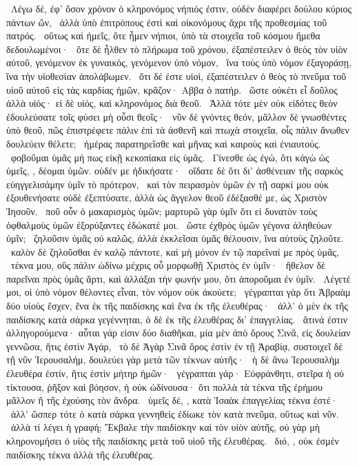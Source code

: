 ~Λέγω δέ, ἐφ’ ὅσον χρόνον ὁ κληρονόμος νήπιός ἐστιν, οὐδὲν διαφέρει δούλου κύριος πάντων ὤν,
~ἀλλὰ ὑπὸ ἐπιτρόπους ἐστὶ καὶ οἰκονόμους ἄχρι τῆς προθεσμίας τοῦ πατρός.
~οὕτως καὶ ἡμεῖς, ὅτε ἦμεν νήπιοι, ὑπὸ τὰ στοιχεῖα τοῦ κόσμου ἤμεθα δεδουλωμένοι·
~ὅτε δὲ ἦλθεν τὸ πλήρωμα τοῦ χρόνου, ἐξαπέστειλεν ὁ θεὸς τὸν υἱὸν αὐτοῦ, γενόμενον ἐκ γυναικός, γενόμενον ὑπὸ νόμον,
~ἵνα τοὺς ὑπὸ νόμον ἐξαγοράσῃ, ἵνα τὴν υἱοθεσίαν ἀπολάβωμεν.
~ὅτι δέ ἐστε υἱοί, ἐξαπέστειλεν ὁ θεὸς τὸ πνεῦμα τοῦ υἱοῦ αὐτοῦ εἰς τὰς καρδίας ἡμῶν, κρᾶζον· Αββα ὁ πατήρ.
~ὥστε οὐκέτι εἶ δοῦλος ἀλλὰ υἱός· εἰ δὲ υἱός, καὶ κληρονόμος διὰ θεοῦ.
~Ἀλλὰ τότε μὲν οὐκ εἰδότες θεὸν ἐδουλεύσατε τοῖς φύσει μὴ οὖσι θεοῖς·
~νῦν δὲ γνόντες θεόν, μᾶλλον δὲ γνωσθέντες ὑπὸ θεοῦ, πῶς ἐπιστρέφετε πάλιν ἐπὶ τὰ ἀσθενῆ καὶ πτωχὰ στοιχεῖα, οἷς πάλιν ἄνωθεν δουλεύειν θέλετε;
~ἡμέρας παρατηρεῖσθε καὶ μῆνας καὶ καιροὺς καὶ ἐνιαυτούς.
~φοβοῦμαι ὑμᾶς μή πως εἰκῇ κεκοπίακα εἰς ὑμᾶς.
~Γίνεσθε ὡς ἐγώ, ὅτι κἀγὼ ὡς ὑμεῖς, , δέομαι ὑμῶν. οὐδέν με ἠδικήσατε·
~οἴδατε δὲ ὅτι δι’ ἀσθένειαν τῆς σαρκὸς εὐηγγελισάμην ὑμῖν τὸ πρότερον,
~καὶ τὸν πειρασμὸν ὑμῶν ἐν τῇ σαρκί μου οὐκ ἐξουθενήσατε οὐδὲ ἐξεπτύσατε, ἀλλὰ ὡς ἄγγελον θεοῦ ἐδέξασθέ με, ὡς Χριστὸν Ἰησοῦν.
~ποῦ οὖν ὁ μακαρισμὸς ὑμῶν; μαρτυρῶ γὰρ ὑμῖν ὅτι εἰ δυνατὸν τοὺς ὀφθαλμοὺς ὑμῶν ἐξορύξαντες ἐδώκατέ μοι.
~ὥστε ἐχθρὸς ὑμῶν γέγονα ἀληθεύων ὑμῖν;
~ζηλοῦσιν ὑμᾶς οὐ καλῶς, ἀλλὰ ἐκκλεῖσαι ὑμᾶς θέλουσιν, ἵνα αὐτοὺς ζηλοῦτε.
~καλὸν δὲ ζηλοῦσθαι ἐν καλῷ πάντοτε, καὶ μὴ μόνον ἐν τῷ παρεῖναί με πρὸς ὑμᾶς,
~τέκνα μου, οὓς πάλιν ὠδίνω μέχρις οὗ μορφωθῇ Χριστὸς ἐν ὑμῖν·
~ἤθελον δὲ παρεῖναι πρὸς ὑμᾶς ἄρτι, καὶ ἀλλάξαι τὴν φωνήν μου, ὅτι ἀποροῦμαι ἐν ὑμῖν.
~Λέγετέ μοι, οἱ ὑπὸ νόμον θέλοντες εἶναι, τὸν νόμον οὐκ ἀκούετε;
~γέγραπται γὰρ ὅτι Ἀβραὰμ δύο υἱοὺς ἔσχεν, ἕνα ἐκ τῆς παιδίσκης καὶ ἕνα ἐκ τῆς ἐλευθέρας·
~ἀλλ’ ὁ μὲν ἐκ τῆς παιδίσκης κατὰ σάρκα γεγέννηται, ὁ δὲ ἐκ τῆς ἐλευθέρας δι’ ἐπαγγελίας.
~ἅτινά ἐστιν ἀλληγορούμενα· αὗται γάρ εἰσιν δύο διαθῆκαι, μία μὲν ἀπὸ ὄρους Σινᾶ, εἰς δουλείαν γεννῶσα, ἥτις ἐστὶν Ἁγάρ,
~τὸ δὲ Ἁγὰρ Σινᾶ ὄρος ἐστὶν ἐν τῇ Ἀραβίᾳ, συστοιχεῖ δὲ τῇ νῦν Ἰερουσαλήμ, δουλεύει γὰρ μετὰ τῶν τέκνων αὐτῆς·
~ἡ δὲ ἄνω Ἰερουσαλὴμ ἐλευθέρα ἐστίν, ἥτις ἐστὶν μήτηρ ἡμῶν·
~γέγραπται γάρ· Εὐφράνθητι, στεῖρα ἡ οὐ τίκτουσα, ῥῆξον καὶ βόησον, ἡ οὐκ ὠδίνουσα· ὅτι πολλὰ τὰ τέκνα τῆς ἐρήμου μᾶλλον ἢ τῆς ἐχούσης τὸν ἄνδρα.
~ὑμεῖς δέ, , κατὰ Ἰσαὰκ ἐπαγγελίας τέκνα ἐστέ·
~ἀλλ’ ὥσπερ τότε ὁ κατὰ σάρκα γεννηθεὶς ἐδίωκε τὸν κατὰ πνεῦμα, οὕτως καὶ νῦν.
~ἀλλὰ τί λέγει ἡ γραφή; Ἔκβαλε τὴν παιδίσκην καὶ τὸν υἱὸν αὐτῆς, οὐ γὰρ μὴ κληρονομήσει ὁ υἱὸς τῆς παιδίσκης μετὰ τοῦ υἱοῦ τῆς ἐλευθέρας.
~διό, , οὐκ ἐσμὲν παιδίσκης τέκνα ἀλλὰ τῆς ἐλευθέρας.

